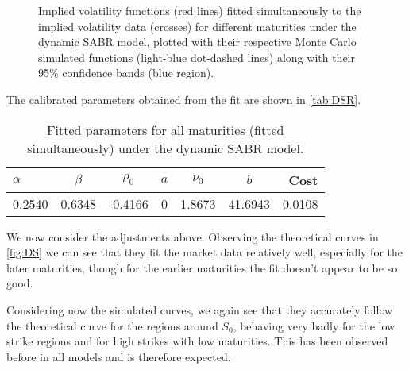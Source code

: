 \begin{figure}[H]
  \begin{subfigmatrix}{2}
  \end{subfigmatrix}
  \caption[Implied volatility functions fitted simultaneously to the implied volatility data for different maturities under the dynamic SABR model, plotted with their respective Monte Carlo simulated functions along with their 95\% confidence bands.]{Implied volatility functions (red lines) fitted simultaneously to the implied volatility data (crosses) for different maturities under the dynamic SABR model, plotted with their respective Monte Carlo simulated functions (light-blue dot-dashed lines) along with their 95\% confidence bands (blue region).}
  \label{fig:DS}
\end{figure}

The calibrated parameters obtained from the fit are shown in \autoref{tab:DSR}.

\begin{table}[H]
    \centering
        \renewcommand{\arraystretch}{0.8}
\begin{tabular}{@{}lcccccr@{}}
\toprule
$\alpha$ & $\beta$ & $\rho_0$ & $a$ & $\nu_0$ & $b$ & Cost \\ \midrule
0.2540 & 0.6348 & -0.4166 & 0 & 1.8673 & 41.6943 & 0.0108 \\
\bottomrule
\end{tabular}
  \caption[Fitted parameters for all maturities (fitted simultaneously) under the dynamic SABR model.]{Fitted parameters for all maturities (fitted simultaneously) under the dynamic SABR model.}
  \label{tab:DSR}
\end{table}


We now consider the adjustments above. Observing the theoretical curves in \autoref{fig:DS} we can see that they fit the market data relatively well, especially for the later maturities, though for the earlier maturities the fit doesn't appear to be so good.

Considering now the simulated curves, we again see that they accurately follow the theoretical curve for the regions around $S_0$, behaving very badly for the low strike regions and for high strikes with low maturities. This has been observed before in all models and is therefore expected.


